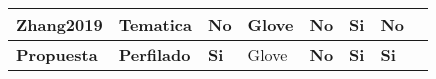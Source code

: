 \begin{table}[!ht]
{\begin{tabular}{llllllll}
Zhang2019          & Tematica             & No                                                              & Glove                                                      & No                                                                    & Si          & No                                                                                  \\ \hline
\textbf{Propuesta} & \textbf{Perfilado} & \textbf{Si}                                                     & Glove                                                      & \textbf{No}                                                                    & \textbf{Si} & \textbf{Si}                                                                         \\ \hline
\end{tabular}

}
\end{table}
